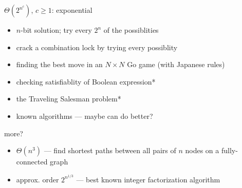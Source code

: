 \begin{frame}{$\Theta(2^{n^c})$, $c\ge1$: exponential}
    \begin{itemize}
        \item $n$-bit solution; try every $2^n$ of the possiblities
            \vspace{.5cm}
        \item crack a combination lock by trying every possiblity
        \item finding the best move in an $N\times N$ Go game (with Japanese rules)
        \item checking satisfiablity of Boolean expression*
        \item the Traveling Salesman problem*
        \item {\scriptsize *known algorithms --- maybe can do better?}
    \end{itemize}
\end{frame}

\begin{frame}{more?}
    \begin{itemize}
    \item $\Theta(n^3)$ --- find shortest paths between all pairs of $n$ nodes on a fully-connected graph
    \item approx. order $2^{n^{1/3}}$ --- best known integer factorization algorithm
    \end{itemize}
\end{frame}
